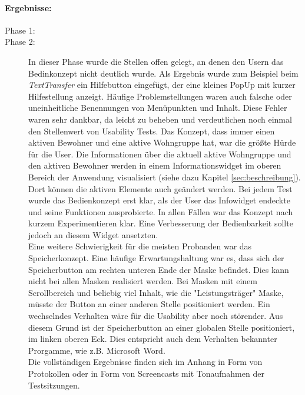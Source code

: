 \paragraph*{Ergebnisse:}
\begin{description}

\item[Phase 1:]

\item[Phase 2:] In dieser Phase wurde die Stellen offen gelegt, an denen den Usern das Bedinkonzept nicht deutlich wurde.
Als Ergebnis wurde zum Beispiel beim \textit{TextTransfer} ein Hilfebutton eingefügt, der eine kleines PopUp mit kurzer Hilfestellung anzeigt.
Häufige Problemstellungen waren auch falsche oder uneinheitliche Benennungen von Menüpunkten und Inhalt. Diese Fehler waren sehr dankbar, da leicht zu beheben und verdeutlichen noch einmal den Stellenwert von Usability Tests. Das Konzept, dass \EBP immer einen aktiven Bewohner und eine aktive Wohngruppe hat, war die größte Hürde für die User.
Die Informationen über die aktuell aktive Wohngruppe und den aktiven Bewohner werden in einem Informationswidget im oberen Bereich der Anwendung visualisiert (siehe dazu Kapitel \ref{sec:beschreibung}). Dort können die aktiven Elemente auch geändert werden. Bei jedem Test wurde das Bedienkonzept erst klar, als der User das Infowidget endeckte und seine Funktionen  ausprobierte. In allen Fällen war das 
Konzept nach kurzem Experimentieren klar. Eine Verbesserung der Bedienbarkeit sollte jedoch an diesem Widget ansetzten.\\
Eine weitere Schwierigkeit für die meisten Probanden war das Speicherkonzept. Eine häufige Erwartungshaltung war es, dass sich der Speicherbutton am rechten unteren Ende der Maske befindet. Dies kann nicht bei allen Masken realisiert werden. Bei Masken mit einem Scrollbereich und beliebig viel Inhalt, wie die "Leistungsträger" Maske, müsste der Button an einer anderen Stelle positioniert werden. Ein wechselndes Verhalten wäre für die Usability aber noch störender. Aus diesem Grund ist der Speicherbutton an einer globalen Stelle positioniert, im linken oberen Eck. Dies entspricht auch dem Verhalten bekannter Prorgamme, wie z.B. Microsoft Word.\\
Die vollständigen Ergebnisse finden sich im Anhang in Form von Protokollen oder in Form von Screencasts mit Tonaufnahmen der Testsitzungen.

\end{description}


